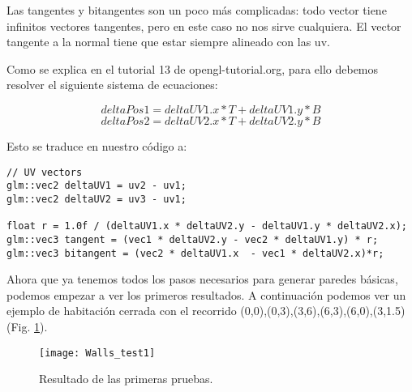 Las tangentes y bitangentes son un poco más complicadas: todo vector tiene infinitos vectores tangentes, pero en este caso no nos sirve cualquiera. El vector tangente a la normal tiene que estar siempre alineado con las uv.

Como se explica en el tutorial 13 de opengl-tutorial.org, para ello debemos resolver el siguiente sistema de ecuaciones:


\[ deltaPos1 = deltaUV1.x * T + deltaUV1.y * B \]
\[ deltaPos2 = deltaUV2.x * T + deltaUV2.y * B \]

Esto se traduce en nuestro código a:

\begin{lstlisting}
// UV vectors
glm::vec2 deltaUV1 = uv2 - uv1;
glm::vec2 deltaUV2 = uv3 - uv1;

float r = 1.0f / (deltaUV1.x * deltaUV2.y - deltaUV1.y * deltaUV2.x);
glm::vec3 tangent = (vec1 * deltaUV2.y - vec2 * deltaUV1.y) * r;
glm::vec3 bitangent = (vec2 * deltaUV1.x  - vec1 * deltaUV2.x)*r;
\end{lstlisting}

Ahora que ya tenemos todos los pasos necesarios para generar paredes básicas, podemos empezar a ver los primeros resultados. A continuación podemos ver un ejemplo de habitación cerrada con el recorrido (0,0),(0,3),(3,6),(6,3),(6,0),(3,1.5) (Fig. \ref{fig:walls_test_1}).

\begin{figure}[H]
    \centering
    \texttt{[image: Walls\_test1]}
    \caption{Resultado de las primeras pruebas.}
    \label{fig:walls_test_1}
\end{figure}
